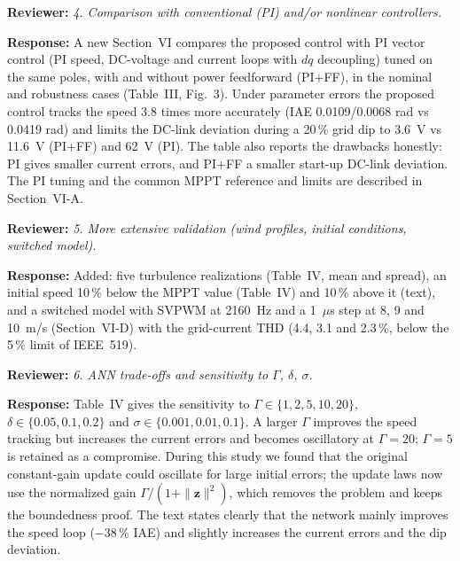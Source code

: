 \documentclass[11pt,a4paper]{article}
\newcommand{\rev}[1]{\par\smallskip\noindent\textbf{Reviewer:} \emph{#1}\par\smallskip\noindent\textbf{Response:} }
\begin{document}
\rev{4. Comparison with conventional (PI) and/or nonlinear controllers.}
A new Section~VI compares the proposed control with PI vector control (PI speed, DC-voltage and current
loops with $dq$ decoupling) tuned on the same poles, with and without power feedforward (PI+FF), in the
nominal and robustness cases (Table~III, Fig.~3). Under parameter errors the proposed control tracks
the speed 3.8 times more accurately (IAE 0.0109/0.0068 rad vs 0.0419 rad) and limits the DC-link
deviation during a 20\,\% grid dip to 3.6~V vs 11.6~V (PI+FF) and 62~V (PI). The table also reports
the drawbacks honestly: PI gives smaller current errors, and PI+FF a smaller start-up DC-link
deviation. The PI tuning and the common MPPT reference and limits are described in Section~VI-A.

\rev{5. More extensive validation (wind profiles, initial conditions, switched model).}
Added: five turbulence realizations (Table~IV, mean and spread), an initial speed 10\,\% below the
MPPT value (Table~IV) and 10\,\% above it (text), and a switched model with SVPWM at 2160~Hz and a
1~$\mu$s step at 8, 9 and 10~m/s (Section~VI-D) with the grid-current THD (4.4, 3.1 and 2.3\,\%,
below the 5\,\% limit of IEEE~519).

\rev{6. ANN trade-offs and sensitivity to $\Gamma$, $\delta$, $\sigma$.}
Table~IV gives the sensitivity to $\Gamma\in\{1,2,5,10,20\}$, $\delta\in\{0.05,0.1,0.2\}$ and
$\sigma\in\{0.001,0.01,0.1\}$. A larger $\Gamma$ improves the speed tracking but increases the current
errors and becomes oscillatory at $\Gamma=20$; $\Gamma=5$ is retained as a compromise. During this study
we found that the original constant-gain update could oscillate for large initial errors; the update
laws now use the normalized gain $\Gamma/(1+\|\mathbf z\|^2)$, which removes the problem and keeps the
boundedness proof. The text states clearly that the network mainly improves the speed loop
($-38$\,\% IAE) and slightly increases the current errors and the dip deviation.
\end{document}
